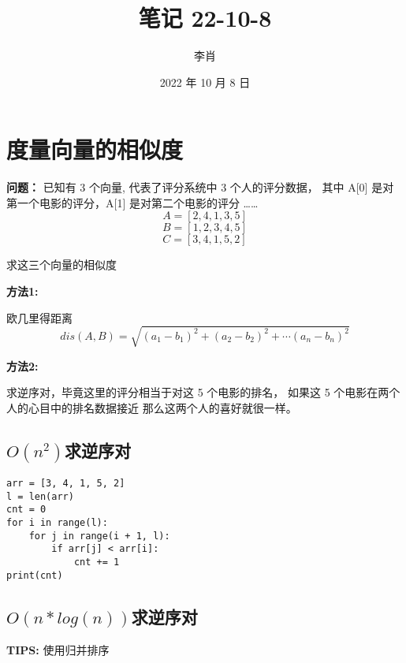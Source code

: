 \documentclass[UTF8]{ctexart}
\title{笔记 22-10-8}
\author{李肖}
\date{2022 年 10 月 8 日}
\begin{document}
\maketitle
\section{度量向量的相似度}

\textbf{问题： }已知有 3 个向量, 代表了评分系统中 3 个人的评分数据，
其中 A[0] 是对第一个电影的评分，A[1] 是对第二个电影的评分 ……
$$ A = [2, 4, 1, 3, 5] $$
$$ B = [1, 2, 3, 4, 5] $$
$$ C = [3, 4, 1, 5, 2] $$

求这三个向量的相似度

\vskip 0.3cm
\textbf{方法1:}

欧几里得距离
$$ dis(A, B) = \sqrt{(a_1 - b_1) ^ 2 + (a_2 - b_2) ^ 2 + \cdots (a_n - b_n) ^ 2} $$

\vskip 0.3cm
\textbf{方法2:}

求逆序对，毕竟这里的评分相当于对这 5 个电影的排名，
如果这 5 个电影在两个人的心目中的排名数据接近
那么这两个人的喜好就很一样。

\subsection{$O(n^2)$求逆序对}

\begin{lstlisting}
arr = [3, 4, 1, 5, 2]
l = len(arr)
cnt = 0
for i in range(l):
    for j in range(i + 1, l):
        if arr[j] < arr[i]:
            cnt += 1
print(cnt)
\end{lstlisting}

\subsection{$O(n*log(n))$求逆序对}

\noindent
\textbf{TIPS: }使用归并排序
\end{document}
